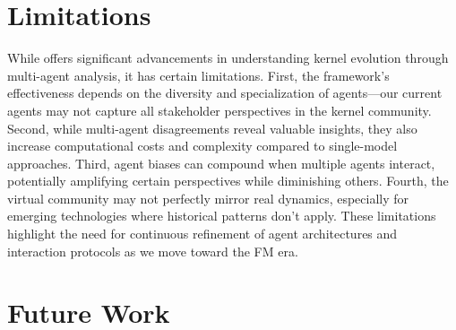 \section{Limitations}
\label{sec:limitations}

While \sys offers significant advancements in understanding kernel evolution through multi-agent analysis, it has certain limitations. First, the framework's effectiveness depends on the diversity and specialization of agents—our current agents may not capture all stakeholder perspectives in the kernel community. Second, while multi-agent disagreements reveal valuable insights, they also increase computational costs and complexity compared to single-model approaches. Third, agent biases can compound when multiple agents interact, potentially amplifying certain perspectives while diminishing others. Fourth, the virtual community may not perfectly mirror real dynamics, especially for emerging technologies where historical patterns don't apply. These limitations highlight the need for continuous refinement of agent architectures and interaction protocols as we move toward the FM era.

\section{Future Work}
\label{sec:future}

